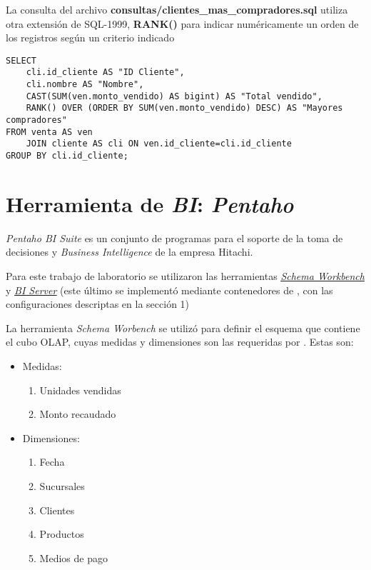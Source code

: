 La consulta del archivo \textbf{consultas/clientes\_mas\_compradores.sql} utiliza otra extensión de SQL-1999, \textbf{RANK()} para indicar numéricamente un orden de los registros según un criterio indicado  

\vspace*{5mm}
\begin{lstlisting}[title=Clientes que generan mayores ingresos para la empresa]
SELECT 
    cli.id_cliente AS "ID Cliente", 
    cli.nombre AS "Nombre", 
    CAST(SUM(ven.monto_vendido) AS bigint) AS "Total vendido", 
    RANK() OVER (ORDER BY SUM(ven.monto_vendido) DESC) AS "Mayores compradores" 
FROM venta AS ven 
    JOIN cliente AS cli ON ven.id_cliente=cli.id_cliente 
GROUP BY cli.id_cliente;
\end{lstlisting}




\section{Herramienta de \emph{BI}: \emph{Pentaho}}

\emph{Pentaho BI Suite} es un conjunto de programas para el soporte de la toma de decisiones y \emph{Business Intelligence} \autocite{wikipedia-pentaho} de la empresa Hitachi. 

Para este trabajo de laboratorio se utilizaron las herramientas \underline{\href{https://mondrian.pentaho.com/documentation/workbench.php}{\emph{Schema Workbench}}} y \underline{\href{https://help.pentaho.com/Documentation/7.1/Installation}{\emph{BI Server}}} (este último se implementó mediante contenedores de \docker{}, con las configuraciones descriptas en la sección 1)

La herramienta \emph{Schema Worbench} se utilizó para definir el esquema que contiene el cubo OLAP, cuyas medidas y dimensiones son las requeridas por . Estas son:

\begin{itemize}
    \item Medidas:
        \begin{enumerate}
            \item Unidades vendidas
            \item Monto recaudado
        \end{enumerate}
    \item Dimensiones:
        \begin{enumerate}
            \item Fecha
            \item Sucursales
            \item Clientes
            \item Productos
            \item Medios de pago
        \end{enumerate}
\end{itemize}



